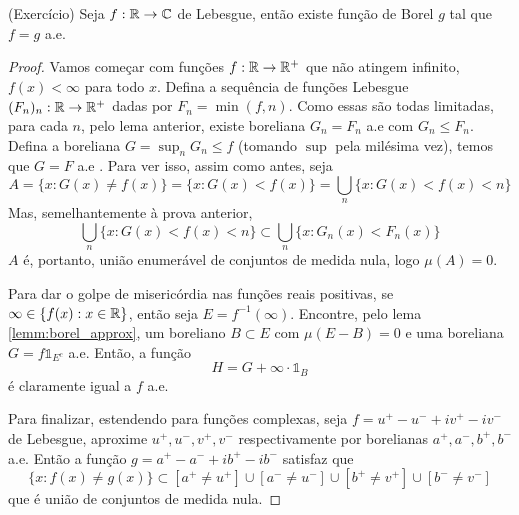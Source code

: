 \begin{lemma}
    (Exercício)
    Seja $f : \mathbb{R} \rightarrow \mathbb{C}$ de Lebesgue, então existe função de Borel $g$ tal que 
    $f = g$ a.e.
\end{lemma}
\begin{proof}
    Vamos começar com funções $f : \mathbb{R} \rightarrow \mathbb{R}^+$ que não atingem infinito, $f(x) < \infty$ para todo $x$.
    Defina a sequência de funções Lebesgue $(F_n)_n : \mathbb{R} \rightarrow \mathbb{R}^+$ dadas por $F_n = \min(f,n)$. Como essas são
    todas limitadas, para cada $n$, pelo lema anterior, existe boreliana $G_n = F_n$ a.e com $G_n \leq F_n$.
    Defina a boreliana $G = \sup_n G_n \leq f$ (tomando $\sup$ pela milésima vez), temos que $G = F$ a.e .
    Para ver isso, assim como antes, seja 
    $$A = \{x : G(x) \neq f(x)\} = \{x : G(x) < f(x)\} = \bigcup_n \{x : G(x) < f(x) < n\}$$
    Mas, semelhantemente à prova anterior,
    $$\bigcup_n \{x : G(x) < f(x) < n\} \subset \bigcup_n \{x : G_n(x) < F_n(x)\}$$
    $A$ é, portanto, união enumerável de conjuntos de medida nula, logo $\mu(A) = 0$.

    Para dar o golpe de misericórdia nas funções reais positivas, se $\infty \in \{f(x) : x \in \mathbb{R}\}$, então seja $E = f^{-1}(\infty)$.
    Encontre, pelo lema \ref{lemm:borel_approx}, um boreliano $B \subset E$ com $\mu(E - B) = 0$ e uma boreliana 
    $G = f\mathds{1}_{E^c}$ a.e. Então, a função 
    $$H = G  + \infty \cdot \mathds{1}_{B}$$
    é claramente igual a $f$ a.e.

    Para finalizar, estendendo para funções complexas, seja $f = u^+ - u^- + iv^+ - iv^-$ de Lebesgue,
    aproxime $u^+, u^-, v^+, v^-$ respectivamente por borelianas $a^+, a^-, b^+, b^-$ a.e. Então
    a função $g = a^+ - a^- + ib^+ - ib^-$ satisfaz que 
    $$\{x : f(x) \neq g(x)\} \subset [a^+ \neq u^+] \cup [a^- \neq u^-] \cup [b^+ \neq v^+] \cup [b^- \neq v^-] $$
    que é união de conjuntos de medida nula.
\end{proof}

